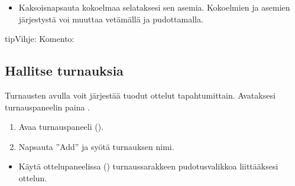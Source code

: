 \documentclass[letterpaper,10pt,finnish]{sphinxmanual}
\begin{document}
\sphinxAtStartPar
{}
\begin{itemize}
\item {} 
\sphinxAtStartPar
Kaksoisnapsauta kokoelmaa selataksesi sen asemia. Kokoelmien ja asemien järjestystä voi muuttaa vetämällä ja pudottamalla.

\end{itemize}

\begin{sphinxadmonition}{tip}{Vihje:}
\sphinxAtStartPar
Komento: 
\end{sphinxadmonition}


\subsection{Hallitse turnauksia}
\label{\detokenize{guide_utilisateur:gerer-les-tournois}}
\sphinxAtStartPar
Turnausten avulla voit järjestää tuodut ottelut tapahtumittain. Avataksesi turnauspaneelin paina .

\sphinxAtStartPar
{}
\begin{enumerate}
%
\item {} 
\sphinxAtStartPar
Avaa turnauspaneeli ().

\item {} 
\sphinxAtStartPar
Napsauta ”Add” ja syötä turnauksen nimi.

\end{enumerate}

\sphinxAtStartPar
{}
\begin{itemize}
\item {} 
\sphinxAtStartPar
Käytä ottelupaneelissa () turnaussarakkeen pudotusvalikkoa liittääksesi ottelun.

\end{itemize}
\end{document}
